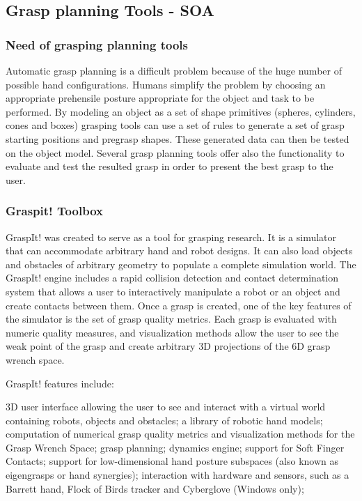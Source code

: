 \subsection{Grasp planning Tools - SOA}
\subsubsection{Need of grasping planning tools}
\par
Automatic grasp planning is a difficult problem because of the huge number of possible hand configurations. Humans simplify the problem by choosing an appropriate prehensile posture appropriate for the object and task to be performed. By modeling an object as a set of shape primitives (spheres, cylinders, cones and boxes) grasping tools can use a set of rules to generate a set of grasp starting positions and pregrasp shapes. These generated data can then be tested on the object model. Several grasp planning tools offer also the functionality to evaluate and test the resulted grasp in order to present the best grasp to the user.
\subsubsection{Graspit! Toolbox}
\par
GraspIt! was created to serve as a tool for grasping research. It is a simulator that can accommodate arbitrary hand and robot designs. It can also load objects and obstacles of arbitrary geometry to populate a complete simulation world. The GraspIt! engine includes a rapid collision detection and contact determination system that allows a user to interactively manipulate a robot or an object and create contacts between them. Once a grasp is created, one of the key features of the simulator is the set of grasp quality metrics. Each grasp is evaluated with numeric quality measures, and visualization methods allow the user to see the weak point of the grasp and create arbitrary 3D projections of the 6D grasp wrench space.

\par
GraspIt! features include:

    3D user interface allowing the user to see and interact with a virtual world containing robots, objects and obstacles;
    a library of robotic hand models;
    computation of numerical grasp quality metrics and visualization methods for the Grasp Wrench Space;
    grasp planning;
    dynamics engine;
    support for Soft Finger Contacts;
    support for low-dimensional hand posture subspaces (also known as eigengrasps or hand synergies);
    interaction with hardware and sensors, such as a Barrett hand, Flock of Birds tracker and Cyberglove (Windows only);
\par
